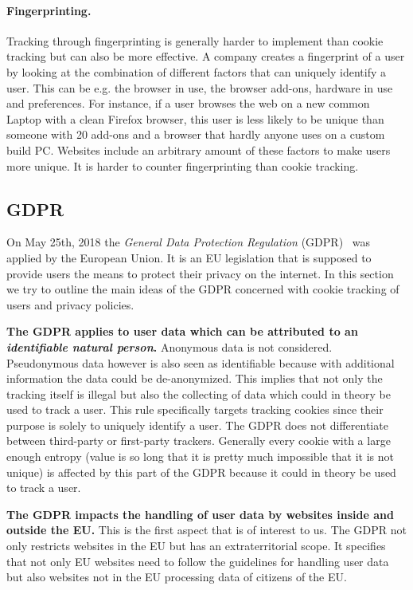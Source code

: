 \paragraph{Fingerprinting.}

Tracking through fingerprinting is generally harder to implement than cookie tracking but can also be more effective. A company
creates a fingerprint of a user by looking at the combination of different factors that can uniquely identify a user. This can
be e.g. the browser in use, the browser add-ons, hardware in use and preferences. For instance, if a user browses the
web on a new common Laptop with a clean Firefox browser, this user is less
likely to be unique than someone with 20 add-ons and a browser that hardly anyone uses on a custom build PC.
Websites include an arbitrary amount of these factors to make users more unique. It is harder to counter fingerprinting
than cookie tracking.

\subsection{GDPR}

On May 25th, 2018 the \emph{General Data Protection Regulation} (GDPR)~\cite{EUdataregulations2018} was applied by the European Union. It is an EU
legislation that is supposed to provide users the means to protect their privacy on the internet. In this section we try
to outline the main ideas of the GDPR concerned with cookie tracking of users and privacy policies.

\textbf{The GDPR applies to user data which can be attributed to an \emph{identifiable natural person}.}
Anonymous data is not considered. Pseudonymous data however is also seen as identifiable because with additional information
the data could be de-anonymized. This implies that not only the tracking itself is illegal but also the collecting of data
which could in theory be used to track a user. This rule specifically targets tracking cookies since their purpose is
solely to uniquely identify a user. The GDPR does not differentiate between third-party or first-party trackers.
Generally every cookie with a large enough entropy (value is so long that it is pretty much impossible that it is not
unique) is affected by this part of the GDPR because it could in theory be used to track a user.

\textbf{The GDPR impacts the handling of user data by websites inside and outside the EU.} This is the first
aspect that is of interest to us. The GDPR not only restricts websites in the EU but has an extraterritorial scope.
It specifies that not only EU websites need to follow the guidelines for handling user data but also websites not in the
EU processing data of citizens of the EU.

